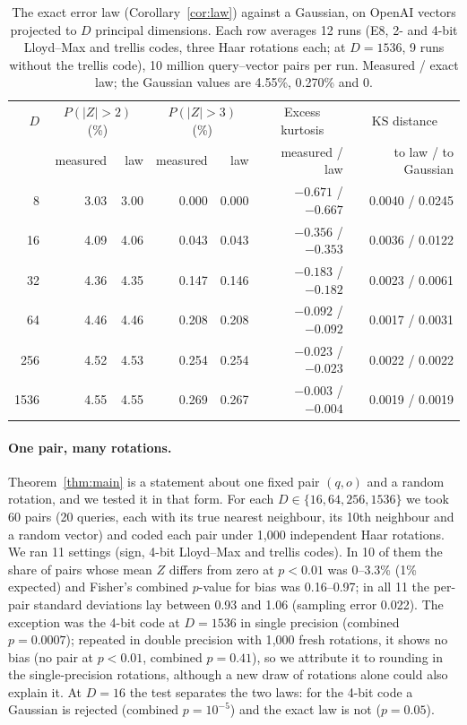\documentclass[10pt]{article}
\begin{document}
\begin{table}[!htbp]
\caption{The exact error law (Corollary~\ref{cor:law}) against a Gaussian, on OpenAI vectors projected to $D$ principal dimensions. Each row averages 12 runs (E8, 2- and 4-bit Lloyd--Max and trellis codes, three Haar rotations each; at $D=1536$, 9 runs without the trellis code), 10 million query--vector pairs per run. Measured / exact law; the Gaussian values are 4.55\%, 0.270\% and 0.}
\label{tab:law}
\small
\begin{tabular}{rrrrrrr}
\toprule
$D$ & \multicolumn{2}{c}{$P(|Z|>2)$ (\%)} & \multicolumn{2}{c}{$P(|Z|>3)$ (\%)} & \multicolumn{1}{c}{Excess kurtosis} & \multicolumn{1}{c}{KS distance} \\
 & measured & law & measured & law & measured / law & to law / to Gaussian \\
\midrule
8 & 3.03 & 3.00 & 0.000 & 0.000 & $-0.671$ / $-0.667$ & 0.0040 / 0.0245 \\
16 & 4.09 & 4.06 & 0.043 & 0.043 & $-0.356$ / $-0.353$ & 0.0036 / 0.0122 \\
32 & 4.36 & 4.35 & 0.147 & 0.146 & $-0.183$ / $-0.182$ & 0.0023 / 0.0061 \\
64 & 4.46 & 4.46 & 0.208 & 0.208 & $-0.092$ / $-0.092$ & 0.0017 / 0.0031 \\
256 & 4.52 & 4.53 & 0.254 & 0.254 & $-0.023$ / $-0.023$ & 0.0022 / 0.0022 \\
1536 & 4.55 & 4.55 & 0.269 & 0.267 & $-0.003$ / $-0.004$ & 0.0019 / 0.0019 \\
\bottomrule
\end{tabular}
\end{table}

\paragraph{One pair, many rotations.} Theorem~\ref{thm:main} is a statement about one fixed pair $(q,o)$ and a random rotation, and we tested it in that form. For each $D\in\{16,64,256,1536\}$ we took 60 pairs (20 queries, each with its true nearest neighbour, its 10th neighbour and a random vector) and coded each pair under 1{,}000 independent Haar rotations. We ran 11 settings (sign, 4-bit Lloyd--Max and trellis codes). In 10 of them the share of pairs whose mean $Z$ differs from zero at $p<0.01$ was 0--3.3\% (1\% expected) and Fisher's combined $p$-value for bias was 0.16--0.97; in all 11 the per-pair standard deviations lay between 0.93 and 1.06 (sampling error 0.022). The exception was the 4-bit code at $D=1536$ in single precision (combined $p=0.0007$); repeated in double precision with 1{,}000 fresh rotations, it shows no bias (no pair at $p<0.01$, combined $p=0.41$), so we attribute it to rounding in the single-precision rotations, although a new draw of rotations alone could also explain it. At $D=16$ the test separates the two laws: for the 4-bit code a Gaussian is rejected (combined $p=10^{-5}$) and the exact law is not ($p=0.05$).
\end{document}
